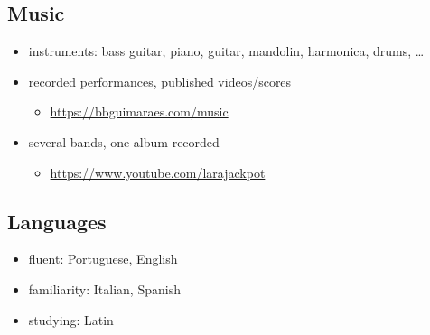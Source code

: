\subsection*{Music}

\begin{itemize}
    \item instruments: bass guitar, piano, guitar, mandolin, harmonica, drums, …
    \item recorded performances, published videos/scores
        \begin{itemize}
            \item \url{https://bbguimaraes.com/music}
        \end{itemize}
    \item several bands, one album recorded
        \begin{itemize}
            \item \url{https://www.youtube.com/larajackpot}
        \end{itemize}
\end{itemize}

\subsection*{Languages}

\begin{itemize}
    \item fluent: Portuguese, English
    \item familiarity: Italian, Spanish
    \item studying: Latin
\end{itemize}
